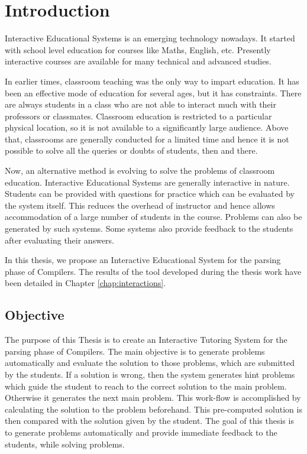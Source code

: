 \chapter{Introduction}
\label{chap:intro}

Interactive Educational Systems is an emerging technology nowadays. It started with school level education for courses like Maths, English, etc. Presently interactive courses are available for many technical and advanced studies. 

In earlier times, classroom teaching was the only way to impart education. It has been an effective mode of education for several ages, but it has constraints. There are always students in a class who are not able to interact much with their professors or classmates. Classroom education is restricted to a particular physical location, so it is not available to a significantly large audience. Above that, classrooms are generally conducted for a limited time and hence it is not possible to solve all the queries or doubts of students, then and there.

Now, an alternative method is evolving to solve the problems of classroom education. Interactive Educational Systems are generally interactive in nature. Students can be provided with questions for practice which can be evaluated by the system itself. This reduces the overhead of instructor and hence allows accommodation of a large number of students in the course. Problems can also be generated by such systems. Some systems also provide feedback to the students after evaluating their answers.

In this thesis, we propose an Interactive Educational System for the parsing phase of Compilers. The results of the tool developed during the thesis work have been detailed in Chapter \ref{chap:interactions}.

\section{Objective}
\label{objective}
The purpose of this Thesis is to create an Interactive Tutoring System for the parsing phase of Compilers. The main objective is to generate problems automatically and evaluate the solution to those problems, which are submitted by the students. If a solution is wrong, then the system generates hint problems which guide the student to reach to the correct solution to the main problem. Otherwise it generates the next main problem. This work-flow is accomplished by calculating the solution to the problem beforehand. This pre-computed solution is then compared with the solution given by the student. The goal of this thesis is to generate problems automatically and provide immediate feedback to the students, while solving problems. 


